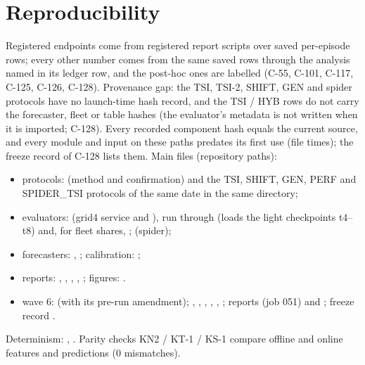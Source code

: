 \documentclass[11pt]{article}
\begin{document}
\section{Reproducibility}\label{sec:repro}
Registered endpoints come from registered report scripts over saved per-episode rows; every other number comes from the same saved rows
through the analysis named in its ledger row, and the post-hoc ones are labelled (C-55, C-101, C-117, C-125, C-126, C-128).
Provenance gap: the TSI, TSI-2, SHIFT, GEN and spider protocols have no launch-time hash record, and the TSI / HYB rows do not carry the
forecaster, fleet or table hashes (the evaluator's metadata is not written when it is imported; C-128). Every recorded component hash equals
the current source, and every module and input on these paths predates its first use (file times); the freeze record of C-128 lists them. Main files (repository paths):
\begin{itemize}\setlength\itemsep{0pt}
\item protocols:  (method and confirmation) and the TSI, SHIFT, GEN, PERF and
SPIDER\_TSI protocols of the same date in the same directory;
\item evaluators:  (grid4 service and ), run through
 (loads the light checkpoints t4--t8) and, for fleet shares, ;  (spider);
\item forecasters: , ; calibration: ;
\item reports: , , , ,
; figures: .
\item wave 6:  (with its pre-run amendment); ,
, , , , ; reports
 (job 051) and ; freeze record .
\end{itemize}
Determinism: , . Parity checks KN2 / KT-1 / KS-1 compare offline and online features and
predictions (0 mismatches).
\end{document}
